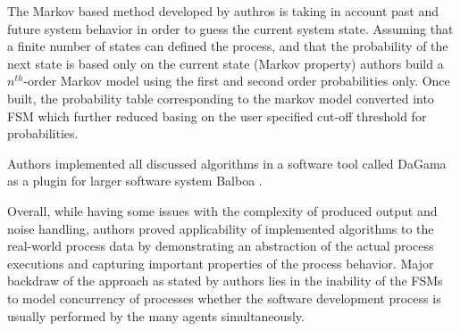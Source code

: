The Markov based method developed by authros is taking in account past and future system behavior in order to guess the current system state. Assuming that a finite number of states can defined the process, and that the probability of the next state is based only on the current state (Markov property) authors build a $n^{th}$-order Markov model using the first and second order probabilities only. Once built, the probability table corresponding to the markov model converted into FSM which further reduced basing on the user specified cut-off threshold for probabilities.

Authors implemented all discussed algorithms in a software tool called DaGama as a plugin for larger software system Balboa \cite{citeulike:5120757}. 

Overall, while having some issues with the complexity of produced output and noise handling, authors proved applicability of implemented algorithms to the real-world process data by demonstrating an abstraction of the actual process executions and capturing important properties of the process behavior. Major backdraw of the approach as stated by authors lies in the inability of the FSMs to model concurrency of processes whether the software development process is usually performed by the many agents simultaneously.